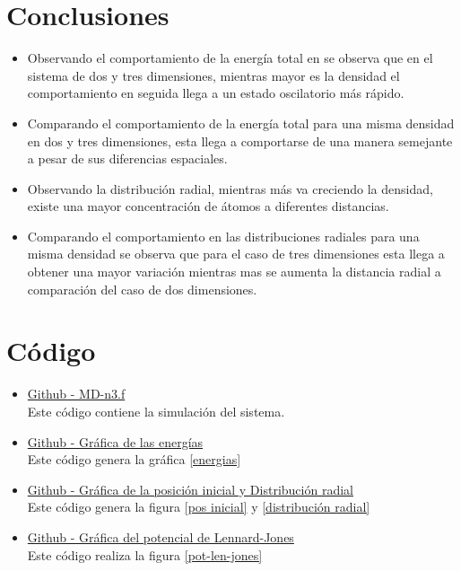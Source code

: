 \documentclass[reprint,amsmath,amssymb,aps,]{revtex4-2}
\begin{document}
\section{Conclusiones}
\begin{itemize}
    \item Observando el comportamiento de la energía total en se observa que en el sistema de dos y tres dimensiones, mientras mayor es la densidad el comportamiento en seguida llega a un estado oscilatorio más rápido.
    \item Comparando el comportamiento de la energía total para una misma densidad en dos y tres dimensiones, esta llega a comportarse de una manera semejante a pesar de sus diferencias espaciales.
    \item Observando la distribución  radial, mientras más va creciendo la densidad, existe una mayor concentración de átomos a diferentes distancias.
    \item Comparando el comportamiento en las distribuciones radiales para una misma densidad se observa que para el caso de tres dimensiones esta llega a obtener una mayor variación mientras mas se aumenta la distancia radial a comparación del caso de dos dimensiones.
\end{itemize}
\section{Código}
\begin{itemize}
\item \href{https://github.com/giovannilopez9808/Notas_Agosto_2020/blob/master/Simulaciones/Proyecto_1/Scripts/MD-n3.f}{Github - MD-n3.f}\\
Este código contiene la simulación del sistema.
\item \href{https://github.com/giovannilopez9808/Notas_Agosto_2020/blob/master/Simulaciones/Proyecto_1/Scripts/Energy_Graphics.py}{Github - Gráfica de las energías}\\
Este código genera la gráfica \ref{energias}
\item \href{https://github.com/giovannilopez9808/Notas_Agosto_2020/blob/master/Simulaciones/Proyecto_1/Scripts/Cor_Graphics.py}{Github - Gráfica de la posición inicial y Distribución radial}\\
Este código genera la figura \ref{pos inicial} y \ref{distribución radial}
\item \href{https://github.com/giovannilopez9808/Notas_Agosto_2020/blob/master/Simulaciones/Proyecto_1/Scripts/Potencial_Graphics.py}{Github - Gráfica del potencial de Lennard-Jones}\\
Este código realiza la figura \ref{pot-len-jones}
\end{itemize}
\nocite{*}

\end{document}
